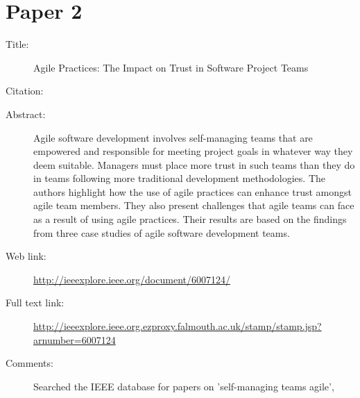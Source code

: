 \documentclass{scrartcl}
\begin{document}
\section*{Paper 2}
\begin{description}
\item[Title:] Agile Practices: The Impact on Trust in Software Project Teams
\item[Citation:] \cite{Paper2}
\item[Abstract:] {Agile software development involves self-managing teams that are empowered and responsible for meeting project goals 
in whatever way they deem suitable. Managers must place more trust in such teams than they do in teams following more traditional 
development methodologies. The authors highlight how the use of agile practices can enhance trust amongst agile team members. They also 
present challenges that agile teams can face as a result of using agile practices. Their results are based on the findings from three 
case studies of agile software development teams.}
\item[Web link:] \url{http://ieeexplore.ieee.org/document/6007124/}
\item[Full text link:] \url{http://ieeexplore.ieee.org.ezproxy.falmouth.ac.uk/stamp/stamp.jsp?arnumber=6007124}
\item[Comments:] Searched the IEEE database for papers on 'self-managing teams agile', 
\end{description}
\end{document}
